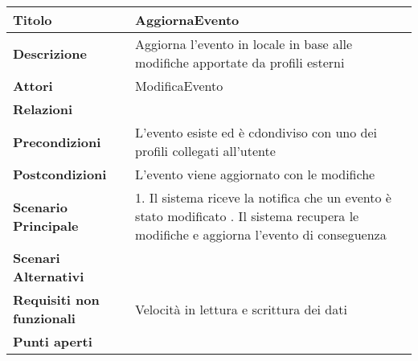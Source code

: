 \begin{tabular} {|P{4.5cm}|P{11cm}|}
  \hline
  \textbf{Titolo}                   & AggiornaEvento                                                                  \\
  \hline
  \textbf{Descrizione}              & Aggiorna l’evento in locale in base alle modifiche apportate da profili esterni \\
  \hline
  \textbf{Attori}                   & ModificaEvento                                                                  \\
  \hline
  \textbf{Relazioni}                &                                                                                 \\
  \hline
  \textbf{Precondizioni}            & L'evento esiste ed è cdondiviso con uno dei profili collegati all'utente        \\
  \hline
  \textbf{Postcondizioni}           & L'evento viene aggiornato con le modifiche                                      \\
  \hline
  \textbf{Scenario Principale}      & 1. Il sistema riceve la notifica che un evento è stato modificato . Il sistema recupera le modifiche e aggiorna l'evento di conseguenza                                              \\
  \hline
  \textbf{Scenari Alternativi}      &                                                                                 \\
  \hline
  \textbf{Requisiti non funzionali} & Velocità in lettura e scrittura dei dati\                                       \\
  \hline
  \textbf{Punti aperti}             &                                                                                 \\
  \hline
\end{tabular}
\hfill
\break

